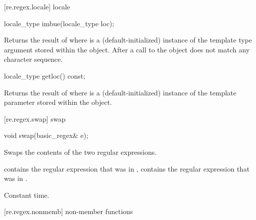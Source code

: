 [re.regex.locale]{ locale}%

%
%
\begin{itemdecl}
locale_type imbue(locale_type loc);
\end{itemdecl}

\begin{itemdescr}
\pnum\effects  Returns the result of  where
 is a (default-initialized) instance of the template
type argument  stored within the object.  After a call
to  the  object does not match any
character sequence.
\end{itemdescr}

%
%
\begin{itemdecl}
locale_type getloc() const; 
\end{itemdecl}

\begin{itemdescr}
\pnum\effects  Returns the result of  where
 is a (default-initialized) instance of the template
parameter  stored within the object.
\end{itemdescr}

[re.regex.swap]{ swap}
%
%

%
%
\begin{itemdecl}
void swap(basic_regex& e); 
\end{itemdecl}

\begin{itemdescr}
\pnum\effects  Swaps the contents of the two regular expressions. 

\pnum\postcondition  {} contains the regular expression
that was in ,  contains the regular expression that
was in . 

\pnum\complexity Constant time. 
\end{itemdescr}

[re.regex.nonmemb]{ non-member functions}

